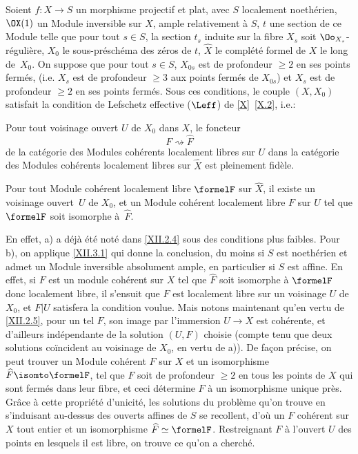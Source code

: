 \begin{corollaire} \label{XII.3.4}
Soient $f:X\to S$ un morphisme projectif et plat, avec $S$ localement noeth\'erien, $\OX(1)$ un Module inversible sur $X$, ample relativement \`a $S$, $t$ une section de ce Module telle que pour tout $s\in S$, la section $t_s$ induite sur la fibre $X_s$ soit $\Oo_{X_s}$-r\'eguli\`ere, $X_0$ le sous-pr\'esch\'ema des z\'eros de $t$, $\widehat{X}$ le compl\'et\'e formel de $X$ le long de~$X_0$. On suppose que pour tout $s\in S$, $X_{0s}$ est de profondeur $\geq 2$ en ses points ferm\'es, (i.e. $X_s$ est de profondeur $\geq 3$ aux points ferm\'es de $X_{0s}$) et $X_s$ est de profondeur $\geq 2$ en ses points ferm\'es. Sous ces conditions, le couple $(X, X_0)$ satisfait la condition de Lefschetz effective ($\Leff$) de \ref{X}~\ref{X.2}, i.e.:
\begin{enumeratea}
\item
Pour tout voisinage ouvert $U$ de $X_0$ dans $X$, le foncteur
\[
F \rightsquigarrow \widehat{F}
\]
de la cat\'egorie des Modules coh\'erents localement libres sur $U$ dans la cat\'egorie des Modules coh\'erents localement libres sur $\widehat{X}$ est pleinement fid\`ele.
\item
Pour tout Module coh\'erent localement libre $\formelF$ sur $\widehat{X}$, il existe un voisinage ouvert~$U$ de $X_0$, et un Module coh\'erent localement libre $F$ sur $U$ tel que $\formelF$ soit isomorphe \`a~$\widehat{F}$.
\end{enumeratea}
\end{corollaire}

En effet, a) a d\'ej\`a \'et\'e not\'e dans \ref{XII.2.4} sous des conditions plus faibles. Pour b), on applique \ref{XII.3.1} qui donne la conclusion, du moins si $S$ est noeth\'erien et admet un Module inversible absolument ample, en particulier si $S$ est affine. En effet, si $F$ est un module coh\'erent sur $X$ tel que $\widehat{F}$ soit isomorphe \`a $\formelF$ donc localement libre, il s'ensuit que $F$ est localement libre sur un voisinage $U$ de $X_0$, et $F|U$ satisfera la condition voulue. Mais notons maintenant qu'en vertu de \ref{XII.2.5}, pour un tel $F$, son image par l'immersion $U\to X$ est coh\'erente, et d'ailleurs ind\'ependante de la solution $(U, F)$ choisie (compte tenu \ignorespaces que deux solutions co\"incident au voisinage de $X_0$, en vertu de a)). De fa\c con pr\'ecise, on peut trouver un Module coh\'erent $F$ sur $X$ et un isomorphisme $\widehat{F}\isomto \formelF$, tel que $F$ soit de profondeur $\geq 2$ en tous les points de $X$ qui sont ferm\'es dans leur fibre, et ceci d\'etermine $F$ \`a un isomorphisme unique pr\`es. Gr\^ace \`a cette propri\'et\'e d'unicit\'e, les solutions du probl\`eme qu'on trouve en s'induisant au-dessus des ouverts affines de $S$ se recollent, d'o\`u un $F$ coh\'erent sur $X$ tout entier et un isomorphisme $\widehat{F}\simeq \formelF$. Restreignant $F$ \`a l'ouvert $U$ des points en lesquels il est libre, on trouve ce qu'on a cherch\'e.

